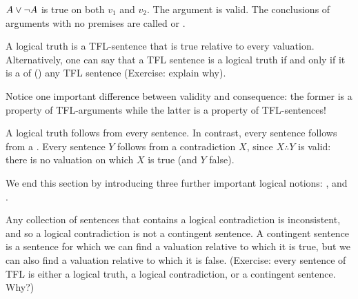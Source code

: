 $A\vee\neg A$ is true on both $v_1$ and $v_2$. The argument is valid. The conclusions of arguments with no premises are called  or .


A logical truth is a TFL-sentence that is true relative to every valuation. Alternatively, one can say that a TFL sentence is a logical truth if and only if it is a  of () any TFL sentence (Exercise: explain why).


Notice one important  difference between validity and consequence: the former is a property of TFL-arguments while the latter is a property of TFL-sentences!

A logical truth follows from every sentence. In contrast, every sentence  follows from a .
Every sentence $Y$ follows from a contradiction $X$, since $X\therefore Y$ is valid: there is no valuation on which $X$ is true (and $Y$ false).

We end this section by introducing three further important logical notions: ,  and .

Any collection of sentences that contains a logical contradiction is inconsistent, and so a logical contradiction is not a contingent sentence. A contingent sentence is a sentence for which we can find a valuation relative to which it is true, but we can also find a valuation relative to which it is false. (Exercise: every sentence of TFL is either a logical truth, a logical contradiction, or a contingent sentence. Why?) 

